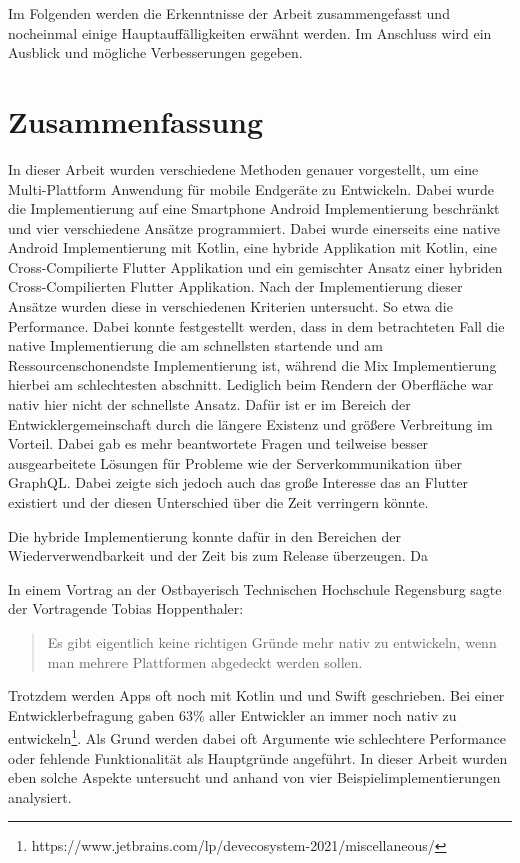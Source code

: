 Im Folgenden werden die Erkenntnisse der Arbeit zusammengefasst und nocheinmal einige Hauptauffälligkeiten erwähnt werden. Im Anschluss wird ein Ausblick und mögliche Verbesserungen gegeben.

\section{Zusammenfassung}
In dieser Arbeit wurden verschiedene Methoden genauer vorgestellt, um eine Multi-Plattform Anwendung für mobile Endgeräte zu Entwickeln. Dabei wurde die Implementierung auf eine Smartphone Android Implementierung beschränkt und vier verschiedene Ansätze programmiert. Dabei wurde einerseits eine native Android Implementierung mit Kotlin, eine hybride Applikation mit Kotlin, eine Cross-Compilierte Flutter Applikation und ein gemischter Ansatz einer hybriden Cross-Compilierten Flutter Applikation. Nach der Implementierung dieser Ansätze wurden diese in verschiedenen Kriterien untersucht. So etwa die Performance. Dabei konnte festgestellt werden, dass in dem betrachteten Fall die native Implementierung die am schnellsten startende und am Ressourcenschonendste Implementierung ist, während die Mix Implementierung hierbei am schlechtesten abschnitt. Lediglich beim Rendern der Oberfläche war nativ hier nicht der schnellste Ansatz. Dafür ist er im Bereich der Entwicklergemeinschaft durch die längere Existenz und größere Verbreitung im Vorteil. Dabei gab es mehr beantwortete Fragen und teilweise besser ausgearbeitete Lösungen für Probleme wie der Serverkommunikation über GraphQL. Dabei zeigte sich jedoch auch das große Interesse das an Flutter existiert und der diesen Unterschied über die Zeit verringern könnte.

Die hybride Implementierung konnte dafür in den Bereichen der Wiederverwendbarkeit und der Zeit bis zum Release überzeugen. Da

In einem Vortrag an der Ostbayerisch Technischen Hochschule Regensburg sagte der Vortragende Tobias Hoppenthaler:
\begin{quote}
Es gibt eigentlich keine richtigen Gründe mehr nativ zu entwickeln, wenn man mehrere Plattformen abgedeckt werden sollen.
\end{quote}
Trotzdem werden Apps oft noch mit Kotlin und und Swift geschrieben. Bei einer Entwicklerbefragung gaben 63\% aller Entwickler an immer noch nativ zu entwickeln\footnote{https://www.jetbrains.com/lp/devecosystem-2021/miscellaneous/}. Als Grund werden dabei oft Argumente wie schlechtere Performance oder fehlende Funktionalität als Hauptgründe angeführt. In dieser Arbeit wurden eben solche Aspekte untersucht und anhand von vier Beispielimplementierungen analysiert. 

